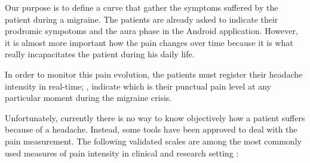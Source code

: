 
\label{sec:paincurve}

Our purpose is to define a curve that gather the symptoms suffered by the patient during a migraine. The patients are already asked to indicate their prodromic sympotoms and the aura phase in the Android application. However, it is almost more important how the pain changes over time because it is what really incapacitates the patient during his daily life.

In order to monitor this pain evolution, the patients must register their headache intensity in real-time; \ie, indicate which is their punctual pain level at any particular moment during the migraine crisis.

Unfortunately, currently there is no way to know objectively how a patient suffers because of a headache. Instead, some tools have been approved to deal with the pain measurement. The following validated scales are among the most commonly used measures of pain intensity in clinical and research setting \cite{hawker2011measures,williamson2005pain,bashir2013comparative,ferreira2011validity}:

